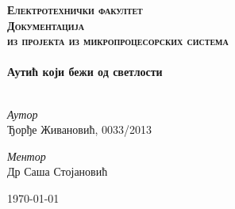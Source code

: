 

\begin{titlepage}

\begin{center}



\textsc{\Huge \textbf{Електротехнички факултет}}\\[5cm]

\textsc{\Huge \textbf{Документација }}\\[0.5cm]
\textsc{\large{\textbf{из пројекта из микропроцесорских система}}}
\\[4cm]

\HRule \\[0.8cm]
{ \Huge \bfseries Аутић који бежи од светлости}\\[0.4cm]

\HRule \\[5cm]

\begin{minipage}{0.55\textwidth}
\begin{flushleft} \large
\emph{Аутор}\\
Ђорђе Живановић, 0033/2013\\
\end{flushleft}
\end{minipage}
\begin{minipage}{0.4\textwidth}
\begin{flushright} \large
\emph{Ментор} \\
Др Саша Стојановић
\end{flushright}
\end{minipage}



\vfill

{\large \today}

\end{center}

\end{titlepage}